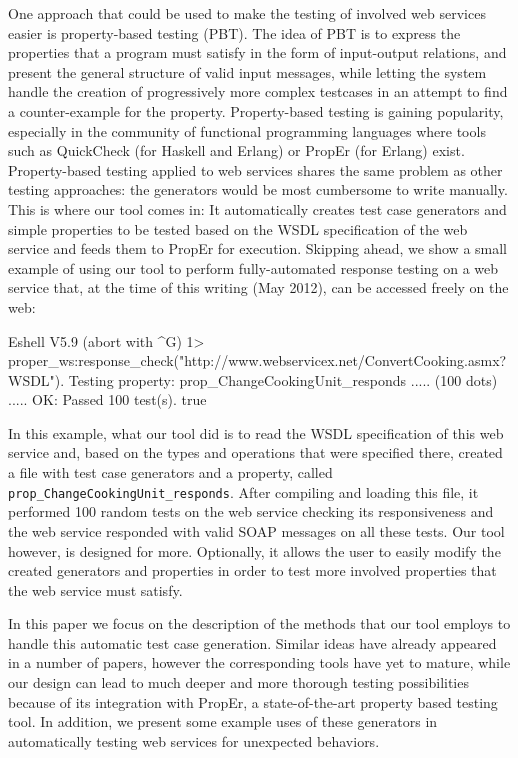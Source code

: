 \documentclass[submission,copyright]{eptcs}
\begin{document}
One approach that could be used to make the testing of involved web
services easier is property-based testing (PBT). The idea of PBT is to
express the properties that a program must satisfy in the form of
input-output relations, and present the general structure of valid
input messages, while letting the system handle the creation of
progressively more complex testcases in an attempt to find a
counter-example for the property. Property-based testing is gaining
popularity, especially in the community of functional programming
languages where tools such as QuickCheck (for Haskell and Erlang) or
PropEr (for Erlang) exist.
%
Property-based testing applied to web services shares the same problem
as other testing approaches: the generators would be most cumbersome
to write manually. This is where our tool comes in: It automatically
creates test case generators and simple properties to be tested based
on the WSDL specification of the web service and feeds them to PropEr
for execution.
%
Skipping ahead, we show a small example of using our tool to perform
fully-automated response testing on a web service that, at the time of
this writing (May 2012), can be accessed freely on the web:

\begin{lstoutput}
Eshell V5.9 (abort with ^G)
1> proper_ws:response_check("http://www.webservicex.net/ConvertCooking.asmx?WSDL").
Testing property: prop_ChangeCookingUnit_responds
..... (100 dots) .....
OK: Passed 100 test(s).
true
\end{lstoutput}

In this example, what our tool did is to read the WSDL specification
of this web service and, based on the types and operations that were
specified there, created a file with test case generators and a
property, called \texttt{prop\_ChangeCookingUnit\_responds}. After
compiling and loading this file, it performed 100 random tests on the
web service checking its responsiveness and the web service responded
with valid SOAP messages on all these tests. Our tool however, is
designed for more. Optionally, it allows the user to easily modify the
created generators and properties in order to test more involved
properties that the web service must satisfy.


In this paper we focus on the description of the methods that our tool
employs to handle this automatic test case generation. Similar ideas
have already appeared in a number of papers, however the corresponding
tools have yet to mature, while our design can lead to much deeper and
more thorough testing possibilities because of its integration with
PropEr, a state-of-the-art property based testing tool. In addition,
we present some example uses of these generators in automatically
testing web services for unexpected behaviors.
\end{document}
